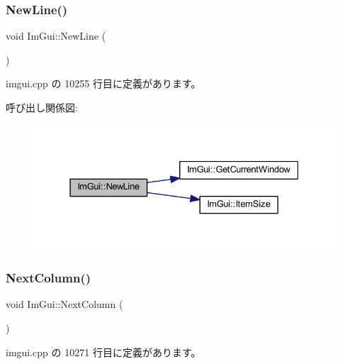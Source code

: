\subsubsection{\texorpdfstring{New\+Line()}{NewLine()}}
{\footnotesize\ttfamily void Im\+Gui\+::\+New\+Line (\begin{DoxyParamCaption}{ }\end{DoxyParamCaption})}



 imgui.\+cpp の 10255 行目に定義があります。

呼び出し関係図\+:\nopagebreak
\begin{figure}[H]
\begin{center}
\leavevmode
\includegraphics[width=331pt]{namespace_im_gui_a77f8b0a33e5335f98661f99e720411da_cgraph}
\end{center}
\end{figure}
\mbox{\label{namespace_im_gui_a8f97746d6a9d59c8400c26fb7613a2ff}} 
\subsubsection{\texorpdfstring{Next\+Column()}{NextColumn()}}
{\footnotesize\ttfamily void Im\+Gui\+::\+Next\+Column (\begin{DoxyParamCaption}{ }\end{DoxyParamCaption})}



 imgui.\+cpp の 10271 行目に定義があります。

